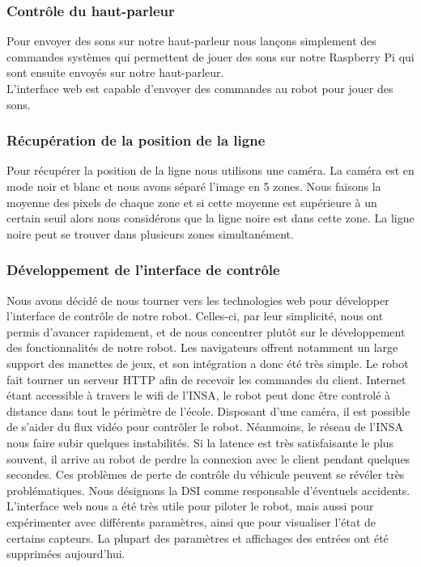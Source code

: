 \subsubsection*{Contrôle du haut-parleur}

Pour envoyer des sons sur notre haut-parleur nous lançons simplement des commandes systèmes qui permettent de jouer des sons sur notre Raspberry Pi qui sont ensuite envoyés sur notre haut-parleur.
\\
L'interface web est capable d'envoyer des commandes au robot pour jouer des sons.

\subsubsection*{Récupération de la position de la ligne}
Pour récupérer la position de la ligne nous utilisons une caméra. La caméra est en mode noir et blanc et nous avons séparé l'image en 5 zones.
Nous faisons la moyenne des pixels de chaque zone et si cette moyenne est supérieure à un certain seuil alors nous considérons que la ligne noire est dans cette zone. La ligne noire peut se trouver dans plusieurs zones simultanément.



\subsubsection{Développement de l'interface de contrôle}
Nous avons décidé de nous tourner vers les technologies web pour développer l'interface de contrôle de notre robot. Celles-ci, par leur simplicité, nous ont permis d'avancer rapidement, et de nous concentrer plutôt sur le développement des fonctionnalités de notre robot. Les navigateurs offrent notamment un large support des manettes de jeux, et son intégration a donc été très simple.
Le robot fait tourner un serveur HTTP afin de recevoir les commandes du client. Internet étant accessible à travers le wifi de l'INSA, le robot peut donc être controlé à distance dans tout le périmètre de l'école. Disposant d'une caméra, il est possible de s'aider du flux vidéo pour contrôler le robot.
Néanmoins, le réseau de l'INSA nous faire subir quelques instabilités. Si la latence est très satisfaisante le plus souvent, il arrive au robot de perdre la connexion avec le client pendant quelques secondes. Ces problèmes de perte de contrôle du véhicule peuvent se révéler très problématiques. Nous désignons la DSI comme responsable d'éventuels accidents.
L'interface web nous a été très utile pour piloter le robot, mais aussi pour expérimenter avec différents paramètres, ainsi que pour visualiser l'état de certains capteurs. La plupart des paramètres et affichages des entrées ont été supprimées aujourd'hui.

